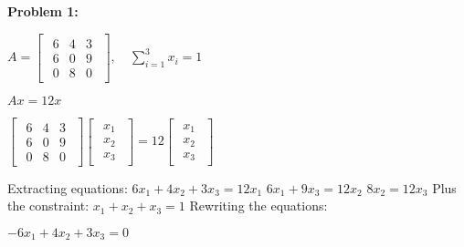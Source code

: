 \textbf{Problem 1:}

\singlespacing

\begin{math}
    A = \begin{bmatrix}
        \begin{array}{ccc}
            6 & 4 & 3 \\
            6 & 0 & 9 \\
            0 & 8 & 0
        \end{array}
    \end{bmatrix},\quad
    \sum_{i=1}^{3}{x_i} = 1
\end{math}

\singlespacing
\singlespacing

$Ax = 12x$

\singlespacing
\singlespacing

\begin{math}
    \begin{bmatrix}
        \begin{array}{ccc}
            6 & 4 & 3 \\
            6 & 0 & 9 \\
            0 & 8 & 0
        \end{array}
    \end{bmatrix}
    \begin{bmatrix}
        \begin{array}{c}
            x_1 \\
            x_2 \\
            x_3
        \end{array}
    \end{bmatrix} = 12
    \begin{bmatrix}
        \begin{array}{c}
            x_1 \\
            x_2 \\
            x_3
        \end{array}
    \end{bmatrix}
\end{math}

\singlespacing
\singlespacing
Extracting equations:
\singlespacing
$6x_1 + 4x_2 + 3x_3 = 12x_1$
\singlespacing
$6x_1 + 9x_3 = 12x_2$
\singlespacing
$8x_2 = 12x_3$
\singlespacing
\singlespacing
Plus the constraint:
\singlespacing
$x_1 + x_2 + x_3 = 1$
\singlespacing
\singlespacing
Rewriting the equations:
\singlespacing

$-6x_1 + 4x_2 + 3x_3 = 0$
\singlespacing

